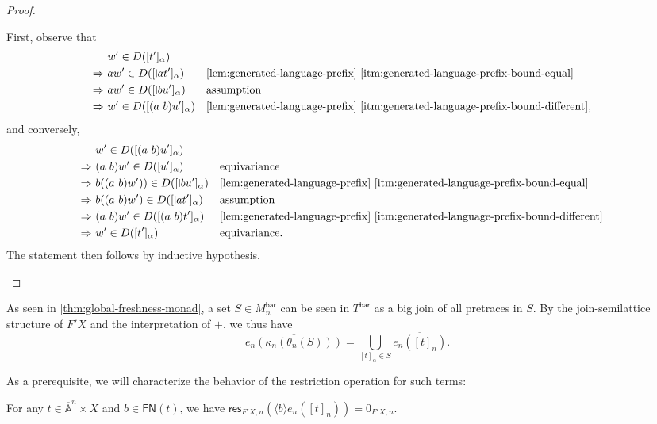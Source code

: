 \documentclass[a4paper,UKenglish,cleveref,thm-restate,numberwithinsect,final]{lipics-v2021}
\newcommand{\Br}{\mathsf{bar}}
\newcommand{\res}{\mathsf{res}}
\newcommand{\FN}{\mathsf{FN}}
\newcommand{\Names}{\mathbb{A}}
\newcommand{\barNames}{\overline{\Names}}
\newcommand{\bind}[1]{\langle #1\rangle}
\theoremstyle{plain}
\newcommand{\midmid}{\hspace{0.2ex}{\rule[-0.1ex]{0.6pt}{1.65ex}}\hspace{0.2ex}}
\newcommand{\newletter}[1]{{\midmid}#1}
\numberwithin{equation}{section}
\newcommand{\+}[1]{\mathcal{#1}\xspace}
\theoremstyle{definition}
\begin{document}
\begin{proof}
\begin{itemize}
        First, observe that
        \begin{align*}
          &w' \in D([t']_\alpha) \\
          \Rightarrow~&aw' \in D([\newletter{a}t']_\alpha) && \text{\cref{lem:generated-language-prefix} \eqref{itm:generated-language-prefix-bound-equal}} \\
          \Rightarrow~&aw' \in D([\newletter{b}u']_\alpha) && \text{assumption} \\
          \Rightarrow~&w' \in D([(a\ b)u']_\alpha) && \text{\cref{lem:generated-language-prefix} \eqref{itm:generated-language-prefix-bound-different}},
        \end{align*}
        and conversely,
        \begin{align*}
          &w' \in D([(a\ b)u']_\alpha) \\
          \Rightarrow~&(a\ b)w' \in D([u']_\alpha) && \text{equivariance} \\
          \Rightarrow~&b((a\ b)w')) \in D([\newletter{b}u']_\alpha) && \text{\cref{lem:generated-language-prefix} \eqref{itm:generated-language-prefix-bound-equal}} \\
          \Rightarrow~&b((a\ b)w') \in D([\newletter{a}t']_\alpha) && \text{assumption} \\
          \Rightarrow~&(a\ b)w' \in D([(a\ b)t']_\alpha) && \text{\cref{lem:generated-language-prefix} \eqref{itm:generated-language-prefix-bound-different}} \\
          \Rightarrow~&w' \in D([t']_\alpha) && \text{equivariance}.
        \end{align*}
        The statement then follows by inductive hypothesis.
  \end{itemize}
\end{proof}

\noindent As seen in \cref{thm:global-freshness-monad}, a set \(S \in M^\Br_n\) can be seen in \(T^\Br\) as a big join of all pretraces in \(S\).
By the join-semilattice structure of \(F' X\) and the interpretation of \(+\), we thus have
\begin{equation*}
  \overline{e_n(\kappa_n(\theta_n(S)))} = \bigcup_{[t]_\alpha \in S} \overline{e_n([t]_n)}.
\end{equation*}

As a prerequisite, we will characterize the behavior of the restriction operation for such terms:
\begin{lemma}\label{lem:generated-language-restriction}
  For any \(t \in \barNames^n \times X\) and \(b \in \FN(t)\), we have \(\res_{F'X, n}(\bind{b} e_n([t]_n)) = 0_{F'X, n}\).
\end{lemma}
\end{document}
